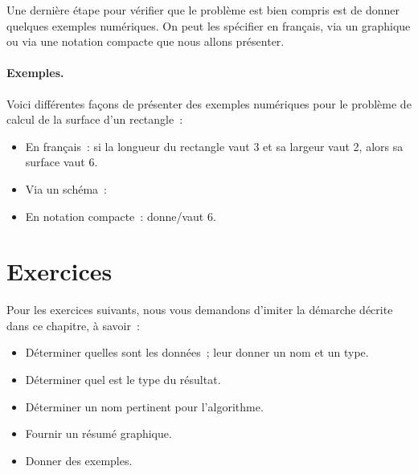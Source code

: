 		Une dernière étape pour vérifier que le problème
		est bien compris est de donner quelques exemples numériques.
		On peut les spécifier en français, 
		via un graphique ou via une notation compacte
		que nous allons présenter.
	
		\begin{Emphase}
			\paragraph{Exemples.}
			Voici différentes façons de présenter des exemples numériques
			pour le problème de calcul de la surface d’un rectangle~:
			\begin{itemize}
			\item En français~: 
				si la longueur du rectangle vaut 3 et sa largeur vaut 2, 
				alors sa surface vaut 6.			
			\item Via un schéma~:	
				\begin{center}
				\end{center}
			\item En notation compacte~:
				 donne/vaut $6$.
			\end{itemize}
		\end{Emphase}
	
\clearpage
	\section{Exercices}
	
		Pour les exercices suivants, 
		nous vous demandons d’imiter la démarche décrite dans ce chapitre, 
		à savoir~:
		\begin{itemize}
			\item Déterminer quelles sont les données~;
				leur donner un nom et un type.
			\item Déterminer quel est le type du résultat.
			\item Déterminer un nom pertinent pour l’algorithme.
			\item Fournir un résumé graphique.
			\item Donner des exemples.
		\end{itemize}
	
